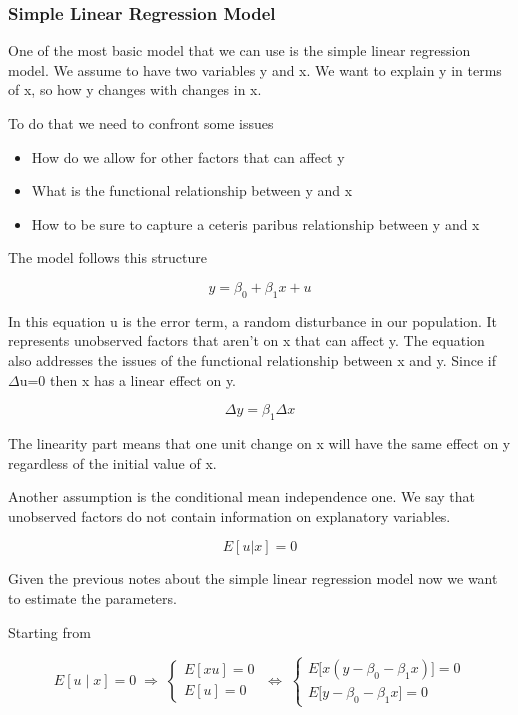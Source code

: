 \subsubsection{Simple Linear Regression Model}

\vspace{10pt}

One of the most basic model that we can use is the simple linear regression model. We assume to have two variables y and x. We want to explain y in terms of x, so how y changes with changes in x.

To do that we need to confront some issues
\begin{itemize}
    \item How do we allow for other factors that can affect y
    \item What is the functional relationship between y and x 
    \item How to be sure to capture a ceteris paribus relationship between y and x 
\end{itemize}

The model follows this structure

\[
y = \beta_0 + \beta_1x + u
\]

In this equation u is the error term, a random disturbance in our population. It represents unobserved factors that aren't on x that can affect y.
The equation also addresses the issues of the functional relationship between x and y. Since if $\Delta$u=0 then x has a linear effect on y.

\[
\Delta y = \beta_1\Delta x
\]

The linearity part means that one unit change on x will have the same effect on y regardless of the initial value of x.

\vspace{10pt}

Another assumption is the conditional mean independence one. We say that unobserved factors do not contain information on explanatory variables.

\[
E[u|x]=0
\]

Given the previous notes about the simple linear regression model now we want to estimate the parameters.

Starting from 

\[
E[u \mid x] = 0 \;\Rightarrow\;
\begin{cases}
E[xu] = 0 \\
E[u] = 0
\end{cases}
\;\Leftrightarrow\;
\begin{cases}
E\big[x (y - \beta_0 - \beta_1 x)\big] = 0 \\
E\big[y - \beta_0 - \beta_1 x\big] = 0
\end{cases}
\]

